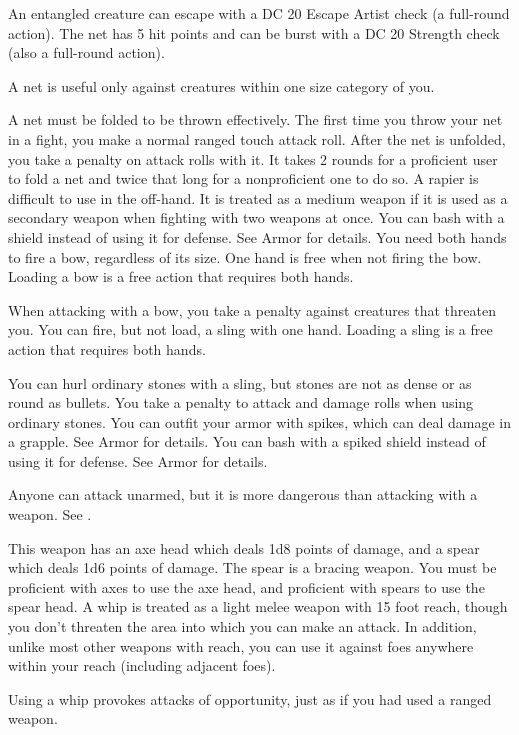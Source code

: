 \par An entangled creature can escape with a DC 20 Escape Artist check (a full-round action). The net has 5 hit points and can be burst with a DC 20 Strength check (also a full-round action).
\par A net is useful only against creatures within one size category of you.
\par A net must be folded to be thrown effectively. The first time you throw your net in a fight, you make a normal ranged touch attack roll. After the net is unfolded, you take a  penalty on attack rolls with it. It takes 2 rounds for a proficient user to fold a net and twice that long for a nonproficient one to do so.
 A rapier is difficult to use in the off-hand. It is treated as a medium weapon if it is used as a secondary weapon when fighting with two weapons at once.
 You can bash with a shield instead of using it for defense. See Armor for details.
 You need both hands to fire a bow, regardless of its size. One hand is free when not firing the bow. Loading a bow is a free action that requires both hands.
\par When attacking with a bow, you take a  penalty against creatures that threaten you.
 You can fire, but not load, a sling with one hand. Loading a sling is a free action that requires both hands.
\par You can hurl ordinary stones with a sling, but stones are not as dense or as round as bullets. You take a  penalty to attack and damage rolls when using ordinary stones.
 You can outfit your armor with spikes, which can deal damage in a grapple. See Armor for details.
 You can bash with a spiked shield instead of using it for defense. See Armor for details.

 Anyone can attack unarmed, but it is more dangerous than attacking with a weapon. See .

 This weapon has an axe head which deals 1d8 points of damage, and a spear which deals 1d6 points of damage. The spear is a bracing weapon. You must be proficient with axes to use the axe head, and proficient with spears to use the spear head.
 A whip is treated as a light melee weapon with 15 foot reach, though you don't threaten the area into which you can make an attack. In addition, unlike most other weapons with reach, you can use it against foes anywhere within your reach (including adjacent foes).
\par Using a whip provokes attacks of opportunity, just as if you had used a ranged weapon.


